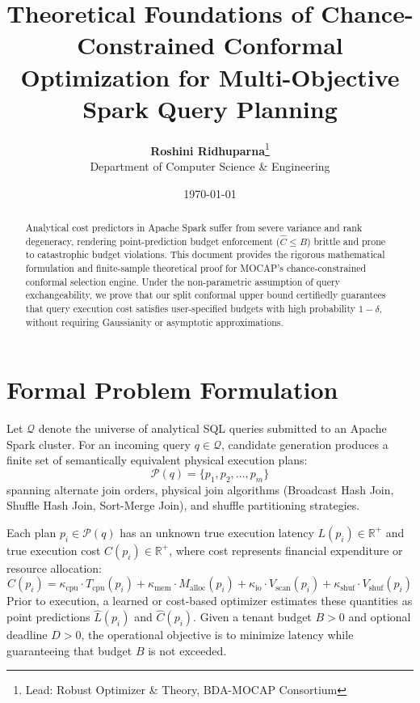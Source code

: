 \documentclass[11pt,a4paper]{article}
\begin{document}
\title{\textbf{Theoretical Foundations of Chance-Constrained Conformal Optimization for Multi-Objective Spark Query Planning}}
\author{\textbf{Roshini Ridhuparna}\thanks{Lead: Robust Optimizer \& Theory, BDA-MOCAP Consortium} \\
Department of Computer Science \& Engineering}
\date{\today}
\maketitle

\begin{abstract}
Analytical cost predictors in Apache Spark suffer from severe variance and rank degeneracy, rendering point-prediction budget enforcement ($\hat{C} \le B$) brittle and prone to catastrophic budget violations. This document provides the rigorous mathematical formulation and finite-sample theoretical proof for MOCAP's chance-constrained conformal selection engine. Under the non-parametric assumption of query exchangeability, we prove that our split conformal upper bound certifiedly guarantees that query execution cost satisfies user-specified budgets with high probability $1 - \delta$, without requiring Gaussianity or asymptotic approximations.
\end{abstract}

\section{Formal Problem Formulation}

Let $\mathcal{Q}$ denote the universe of analytical SQL queries submitted to an Apache Spark cluster. For an incoming query $q \in \mathcal{Q}$, candidate generation produces a finite set of semantically equivalent physical execution plans:
\begin{equation}
    \mathcal{P}(q) = \{p_1, p_2, \dots, p_m\}
\end{equation}
spanning alternate join orders, physical join algorithms (Broadcast Hash Join, Shuffle Hash Join, Sort-Merge Join), and shuffle partitioning strategies.

Each plan $p_i \in \mathcal{P}(q)$ has an unknown true execution latency $L(p_i) \in \mathbb{R}^+$ and true execution cost $C(p_i) \in \mathbb{R}^+$, where cost represents financial expenditure or resource allocation:
\begin{equation}
    C(p_i) = \kappa_{\text{cpu}} \cdot T_{\text{cpu}}(p_i) + \kappa_{\text{mem}} \cdot M_{\text{alloc}}(p_i) + \kappa_{\text{io}} \cdot V_{\text{scan}}(p_i) + \kappa_{\text{shuf}} \cdot V_{\text{shuf}}(p_i)
\end{equation}
Prior to execution, a learned or cost-based optimizer estimates these quantities as point predictions $\hat{L}(p_i)$ and $\hat{C}(p_i)$. Given a tenant budget $B > 0$ and optional deadline $D > 0$, the operational objective is to minimize latency while guaranteeing that budget $B$ is not exceeded.
\end{document}
